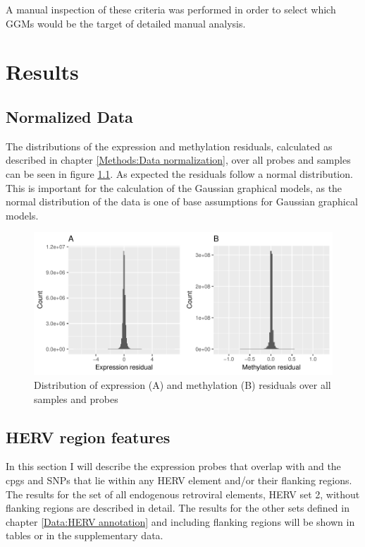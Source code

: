 \documentclass[a4paper,12pt,twoside,openright]{report}
\begin{document}

A manual inspection of these criteria was performed in order to select which GGMs would be the target of detailed manual analysis. 

\newpage
\chapter{Results}
\label{Results}
\section{Normalized Data}
\label{Results:Normalized Data}
The distributions of the expression and methylation residuals, calculated as described in chapter \ref{Methods:Data normalization}, over all probes and samples can be seen in figure \ref{fig:expr.meth.res.hist}. As expected the residuals follow a normal distribution. This is important for the calculation of the Gaussian graphical models, as the normal distribution of the data is one of base assumptions for Gaussian graphical models\cite{Mohammadi2015}.

\begin{figure}[b!]
	\includegraphics[scale=1, keepaspectratio = true]{../figures/expr_meth_res_hist}
	\caption{Distribution of expression (A) and methylation (B) residuals over all samples and probes}
	\label{fig:expr.meth.res.hist}
\end{figure}

\section{HERV region features}
\label{Results:HERV region features}
In this section I will describe the expression probes that overlap with and the cpgs and SNPs that lie within any HERV element and/or their flanking regions. The results for the set of all endogenous retroviral elements, HERV set 2, without flanking regions are described in detail. The results for the other sets defined in chapter \ref{Data:HERV annotation} and including flanking regions will be shown in tables or in the supplementary data.
\end{document}
